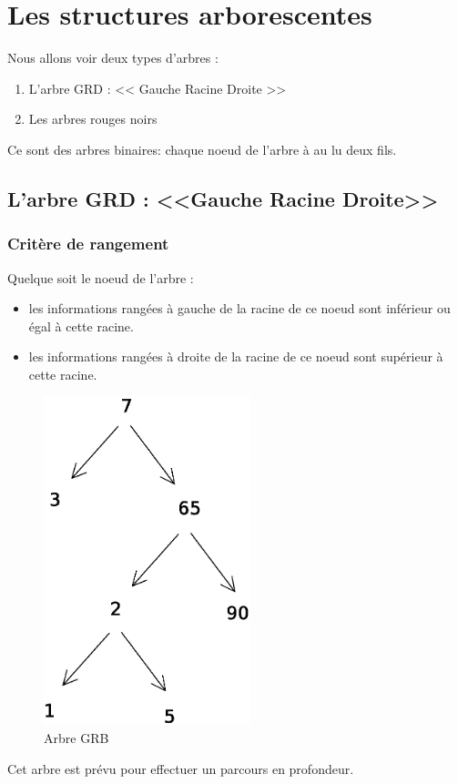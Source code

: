 \chapter{Les structures arborescentes}
\minitoc
Nous allons voir deux types d'arbres : 
\begin{enumerate}
	\item L'arbre GRD : << Gauche Racine Droite >>
	\item Les arbres rouges noirs
\end{enumerate}
Ce sont des arbres binaires: chaque noeud de l'arbre à au lu deux fils. 
\section{L'arbre GRD : <<Gauche Racine Droite>>}
	\subsection{Critère de rangement}
	Quelque soit le noeud de l'arbre : 
	\begin{itemize}
		\item les informations rangées à gauche de la racine de ce noeud sont inférieur ou égal à cette racine.
		\item les informations rangées à droite de la racine de ce noeud sont supérieur à cette racine.
	\end{itemize}
\begin{figure}[H]
\centering
\includegraphics[width=6cm]{content/schemas/arbresGRB.eps}
\caption{Arbre GRB}
\end{figure}
Cet arbre est prévu pour effectuer un parcours en profondeur.
